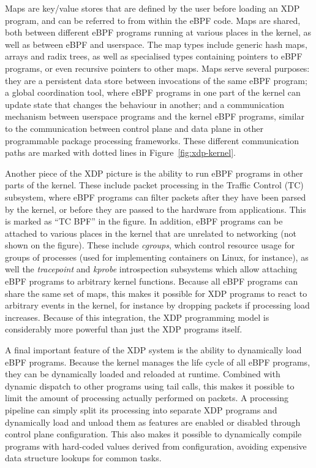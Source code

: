 \documentclass[10pt]{sig-alternate-05-2015}
\begin{document}
Maps are key/value stores that are defined by the user before loading an XDP
program, and can be referred to from within the eBPF code. Maps are shared, both
between different eBPF programs running at various places in the kernel, as well
as between eBPF and userspace. The map types include generic hash maps, arrays
and radix trees, as well as specialised types containing pointers to eBPF
programs, or even recursive pointers to other maps. Maps serve several purposes:
they are a persistent data store between invocations of the same eBPF program; a
global coordination tool, where eBPF programs in one part of the kernel can
update state that changes the behaviour in another; and a communication
mechanism between userspace programs and the kernel eBPF programs, similar to
the communication between control plane and data plane in other programmable
package processing frameworks. These different communication paths are marked
with dotted lines in Figure~\ref{fig:xdp-kernel}.

Another piece of the XDP picture is the ability to run eBPF programs in other
parts of the kernel. These include packet processing in the Traffic Control (TC)
subsystem, where eBPF programs can filter packets after they have been parsed by
the kernel, or before they are passed to the hardware from applications. This is
marked as ``TC BPF'' in the figure. In addition, eBPF programs can be attached
to various places in the kernel that are unrelated to networking (not shown on
the figure). These include \emph{cgroups}, which control resource usage for
groups of processes (used for implementing containers on Linux, for instance),
as well the \emph{tracepoint} and \emph{kprobe} introspection subsystems which
allow attaching eBPF programs to arbitrary kernel functions. Because all eBPF
programs can share the same set of maps, this makes it possible for XDP programs
to react to arbitrary events in the kernel, for instance by dropping packets if
processing load increases. Because of this integration, the XDP programming
model is considerably more powerful than just the XDP programs itself.

A final important feature of the XDP system is the ability to dynamically load
eBPF programs. Because the kernel manages the life cycle of all eBPF programs,
they can be dynamically loaded and reloaded at runtime. Combined with dynamic
dispatch to other programs using tail calls, this makes it possible to limit the
amount of processing actually performed on packets. A processing pipeline can
simply split its processing into separate XDP programs and dynamically load and
unload them as features are enabled or disabled through control plane
configuration. This also makes it possible to dynamically compile programs with
hard-coded values derived from configuration, avoiding expensive data structure
lookups for common tasks.
\end{document}
